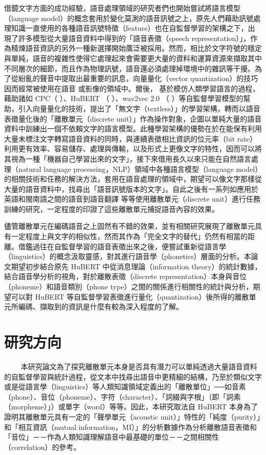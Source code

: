 借鏡文字方面的成功經驗，語音處理領域的研究者們也開始嘗試將語言模型（language model）的概念套用於變化莫測的語音訊號之上，原先人們藉助訊號處理知識一直使用的各種語音訊號特徵（feature）也在自監督學習的架構之下，出現了許多模型從大量語音資料中得到的「語音表徵（speech representation）」，作為精煉語音資訊的另外一種新選擇開始廣泛被採用。然而，相比於文字符號的穩定與單純，語音的複雜性使得它處理起來會需要更大量的資料和運算資源來擷取其中不同層次的細節，而且作為物理訊號，語音還必須處理掉環境中的雜訊等干擾。為了從紛亂的聲音中提取出最重要的訊息，向量量化（vector quantization）的技巧因而經常被使用在語音 \cite{chorowski2019unsupervised, chen2023vector, zhao2023speech} 或影像的領域中。爾後， \cite{lakhotia2021generative}  基於模仿人類學習語言的過程，藉助諸如 CPC（\cite{oord2019representation} ）、HuBERT （\cite{hsu2021hubert} ）、wav2vec 2.0 （\cite{baevski2020wav2vec} ）等自監督學習模型的幫助，引入向量量化的技術，提出了「無文字（textless）」的學習架構，轉而以語音表徵量化後的「離散單元（discrete unit）」作為操作對象，企圖以單純大量的語音資料中訓練出一個不依賴文字的語言模型。此種學習架構的優勢在於在能保有利用大量未標注文字轉寫語音資料的同時，與連續表徵相比資訊的位元率（bit rate）利用更有效率、容易儲存、處理與傳輸，以及形式上更像文字的特性，因而可以將其視為一種「機器自己學習出來的文字」，接下來借用長久以來只能在自然語言處理（natural language processing，NLP）領域中各種語言模型（language model）的相關技術和任務的解決方法，套用在語音處理的領域中，期望可以像文字那樣從大量的語音資料中，找尋出「語音訊號版本的文字」。自此之後有一系列如應用於英語和閩南語之間的語音到語音翻譯 \cite{chen2023speech} 等等使用離散單元（discrete unit）進行任務訓練的研究，一定程度的印證了這些離散單元捕捉語音內容的效果。

儘管離散單元在編碼語音之上固然有不錯的效果，並有相關研究展現了離散單元具有一定程度上與文字的相似性，然而其作為「完全文字的替代」仍然有相當的距離。借鑑過往在自監督學習的語音表徵出來之後，便嘗試重新從語言學（linguistics）的概念汲取靈感，對其進行語音學（phonetics）層面的分析。本論文期望初步結合原先 HuBERT 中從消息理論（information theory）的統計數據，結合語音學分析的視角，對於離散表徵（discrete representation）本身與音位（phoneme）和語音類別（phone type）之間的關係進行相關性的統計與分析，期望可以對 HuBERT 等自監督學習表徵進行量化（quantization）後所得的離散單元所編碼、擷取到的資訊是什麼有較為深入程度的了解。

    
\section{研究方向}
　　
本研究論文為了探究離散單元本身是否具有潛力可以單純透過大量語音資料的自監督學習與統計過程，從文本中找尋出語音中更精細的結構，乃至於類似文字或是從語言學（linguistics）等人類知識領域定義出的「離散單位」──如音素（phone）、音位（phoneme）、字符（character）、「詞綴與字根」（即「詞素（morpheme）」）或單字（word）等等。因此，本研究取法自 HuBERT 本身為了證明其離散單元具有一定的「聲學單元（acoustic unit）」特性的「純度（purity）」和「相互資訊（mutual information，MI）」的分析數據作為分析離散語音表徵和「音位」－－作為人類知識理解語音中最基礎的單位－－之間相關性（correlation）的參考。

